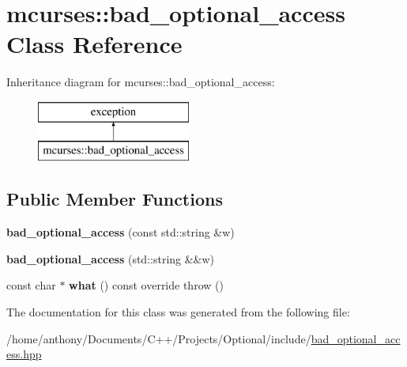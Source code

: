 \hypertarget{classmcurses_1_1bad__optional__access}{}\section{mcurses\+:\+:bad\+\_\+optional\+\_\+access Class Reference}
\label{classmcurses_1_1bad__optional__access}
Inheritance diagram for mcurses\+:\+:bad\+\_\+optional\+\_\+access\+:\begin{figure}[H]
\begin{center}
\leavevmode
\includegraphics[height=2.000000cm]{classmcurses_1_1bad__optional__access}
\end{center}
\end{figure}
\subsection*{Public Member Functions}
\begin{DoxyCompactItemize}
\item 
\hypertarget{classmcurses_1_1bad__optional__access_ad841fbf6af22c6781fb5954adaf05ee6}{}\label{classmcurses_1_1bad__optional__access_ad841fbf6af22c6781fb5954adaf05ee6} 
{\bfseries bad\+\_\+optional\+\_\+access} (const std\+::string \&w)
\item 
\hypertarget{classmcurses_1_1bad__optional__access_a15d77e247e57e228232afe6e27703dcd}{}\label{classmcurses_1_1bad__optional__access_a15d77e247e57e228232afe6e27703dcd} 
{\bfseries bad\+\_\+optional\+\_\+access} (std\+::string \&\&w)
\item 
\hypertarget{classmcurses_1_1bad__optional__access_a6c452e08e0127cd1ec6df96a1bc0e6f0}{}\label{classmcurses_1_1bad__optional__access_a6c452e08e0127cd1ec6df96a1bc0e6f0} 
const char $\ast$ {\bfseries what} () const override  throw ()
\end{DoxyCompactItemize}


The documentation for this class was generated from the following file\+:\begin{DoxyCompactItemize}
\item 
/home/anthony/\+Documents/\+C++/\+Projects/\+Optional/include/\hyperlink{bad__optional__access_8hpp}{bad\+\_\+optional\+\_\+access.\+hpp}\end{DoxyCompactItemize}
